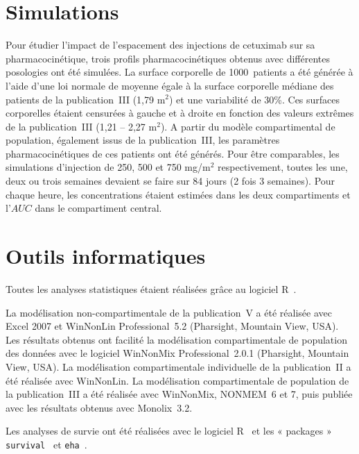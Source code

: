 \section{Simulations}
Pour étudier l'impact de l'espacement des injections de cetuximab sur sa pharmacocinétique, trois profils pharmacocinétiques obtenus avec différentes posologies ont été simulées. La surface corporelle de 1000~patients a été générée à l'aide d'une loi normale de moyenne égale à la surface corporelle médiane des patients de la publication~III (1,79 m$^2$) et une variabilité de 30\%. Ces surfaces corporelles étaient censurées à gauche et à droite en fonction des valeurs extrêmes de la publication~III (1,21 -- 2,27 m$^2$). A partir du modèle compartimental de population, également issus de la publication~III, les paramètres pharmacocinétiques de ces patients ont été générés. Pour être comparables, les simulations d'injection de 250, 500 et 750 mg/m$^2$ respectivement, toutes les une, deux ou trois semaines devaient se faire sur 84 jours (2 fois 3 semaines). Pour chaque heure, les concentrations étaient estimées dans les deux compartiments et l'$AUC$ dans le compartiment central.
\section{Outils informatiques}
Toutes les analyses statistiques étaient réalisées grâce au logiciel R~\citep{REF134}.

La modélisation non-compartimentale de la publication~V a été réalisée avec Excel 2007 et WinNonLin Professional~5.2 (Pharsight, Mountain View, USA). Les résultats obtenus ont facilité la modélisation compartimentale de population des données avec le logiciel WinNonMix Professional~2.0.1 (Pharsight, Mountain View, USA). La modélisation compartimentale individuelle de la publication~II a été réalisée avec WinNonLin. La modélisation compartimentale de population de la publication~III a été réalisée avec WinNonMix, NONMEM~6 et 7, puis publiée avec les résultats obtenus avec Monolix~3.2. 

Les analyses de survie ont été réalisées avec le logiciel R~\citep{REF134} et les « packages » \verb_survival_~\citep{REF134surv} et \verb_eha_~\citep{REF134eha}.
